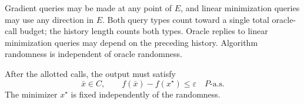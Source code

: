 \documentclass[10pt]{article}
\theoremstyle{definition}
\begin{document}
Gradient queries may be made at any point of $E$, and linear minimization queries may use any direction in $E$. Both query types count toward a single total oracle-call budget; the history length counts both types. Oracle replies to linear minimization queries may depend on the preceding history. Algorithm randomness is independent of oracle randomness.

After the allotted calls, the output must satisfy
\[
\bar{x}\in C,
\qquad f(\bar{x})-f(x^\star)\leq\varepsilon
\quad P\text{-a.s.}
\]
The minimizer $x^\star$ is fixed independently of the randomness.
\end{document}
